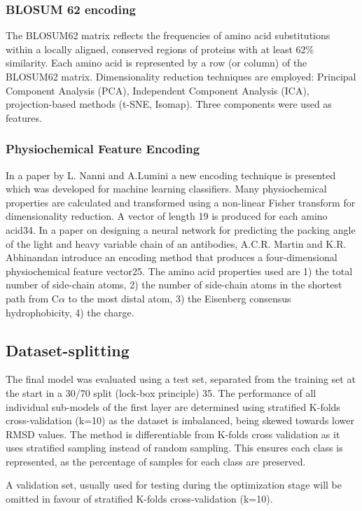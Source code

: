 \documentclass[12pt]{article}
\begin{document}
\subsubsection{BLOSUM 62 encoding}
The BLOSUM62 matrix reflects the frequencies of amino acid
substitutions within a locally aligned, conserved regions of proteins
with at least 62\% similarity. Each amino acid is represented by a row
(or column) of the BLOSUM62 matrix. Dimensionality reduction
techniques are employed: Principal Component Analysis (PCA),
Independent Component Analysis (ICA), projection-based methods (t-SNE,
Isomap). Three components were used as features.

\subsubsection{Physiochemical Feature Encoding}
In a paper by L. Nanni and A.Lumini a new encoding technique is
presented which was developed for machine learning classifiers. Many
physiochemical properties are calculated and transformed using a
non-linear Fisher transform for dimensionality reduction.  A vector of
length 19 is produced for each amino acid34.  In a paper on designing
a neural network for predicting the packing angle of the light and
heavy variable chain of an antibodies, A.C.R. Martin and
K.R. Abhinandan introduce an encoding method that produces a
four-dimensional physiochemical feature vector25. The amino acid
properties used are 1) the total number of side-chain atoms, 2) the
number of side-chain atoms in the shortest path from C$\alpha$ to the most
distal atom, 3) the Eisenberg consensus
hydrophobicity\cite{Eisenberg1982}, 4) the charge.

\subsection{Dataset-splitting}
The final model was evaluated using a test set, separated from the
training set at the start in a 30/70 split (lock-box principle)
35. The performance of all individual sub-models of the first layer
are determined using stratified K-folds cross-validation (k=10) as the
dataset is imbalanced, being skewed towards lower RMSD values. The
method is differentiable from K-folds cross validation as it uses
stratified sampling instead of random sampling. This ensures each
class is represented, as the percentage of samples for each class are
preserved.

A validation set, usually used for testing during the optimization
stage will be omitted in favour of stratified K-folds cross-validation
(k=10)\cite{Krstajic2014,Kohavi1995}.
\end{document}
